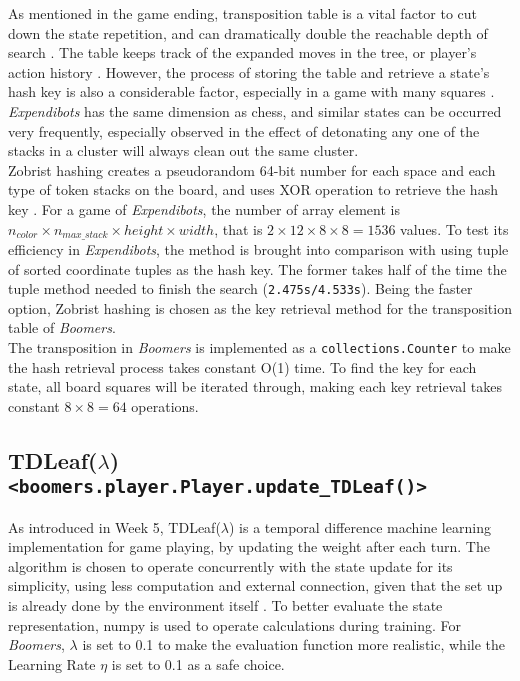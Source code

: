 \documentclass[]{article}
\newcommand{\gameName}{Expendibots}
\begin{document}
As mentioned in the game ending, transposition table is a vital factor to cut down the state repetition, and can dramatically double the reachable depth of search \cite{aima}. The table keeps track of  the expanded moves in the tree, or player's action history \cite{end, table}. However, the process of storing the table and retrieve a state's hash key is also a considerable factor, especially in a game with many squares \cite{table}. \emph{\gameName} has the same dimension as chess, and similar states can be occurred very frequently, especially observed in the effect of detonating any one of the stacks in a cluster will always clean out the same cluster.\\

Zobrist hashing creates a pseudorandom 64-bit number for each space and each type of token stacks on the board, and uses XOR operation to retrieve the hash key \cite{hash}. For a game of \emph{\gameName}, the number of array element is $n_{color} \times n_{max\_stack} \times height \times width$, that is $2 \times 12 \times 8 \times 8 = 1536$ values. To test its efficiency in \emph{\gameName}, the method is brought into comparison with using tuple of sorted coordinate tuples as the hash key. The former takes half of the time the tuple method needed to finish the search (\texttt{2.475s/4.533s}). Being the faster option, Zobrist hashing is chosen as the key retrieval method for the transposition table of \emph{Boomers}.\\

The transposition in \emph{Boomers} is implemented as a \texttt{collections.Counter} to make the hash retrieval process takes constant O(1) time. To find the key for each state, all board squares will be iterated through, making each key retrieval takes constant $8\times8=64$ operations.


\subsection{TDLeaf($\lambda$) \texttt{<boomers.player.Player.update\_TDLeaf()>}}

As introduced in Week 5, TDLeaf($\lambda$) is a temporal difference machine learning implementation for game playing, by updating the weight after each turn. The algorithm is chosen to operate concurrently with the state update for its simplicity, using less computation and external connection, given that the set up is already done by the environment itself \cite{aima}. To better evaluate the state representation, numpy is used to operate calculations during training. For \emph{Boomers}, $\lambda$ is set to 0.1 to make the evaluation function more realistic, while the Learning Rate $\eta$ is set to 0.1 as a safe choice.\\
\end{document}
